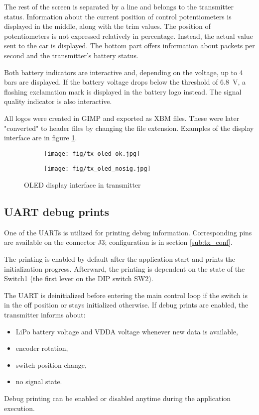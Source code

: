 The rest of the screen is separated by a line and belongs to the transmitter status. Information about the current position of control potentiometers is displayed in the middle, along with the trim values. The position of potentiometers is not expressed relatively in percentage. Instead, the actual value sent to the car is displayed. The bottom part offers information about packets per second and the transmitter's battery status.

Both battery indicators are interactive and, depending on the voltage, up to 4 bars are displayed. If the battery voltage drops below the threshold of \SI{6.8}{\V}, a flashing exclamation mark is displayed in the battery logo instead. The signal quality indicator is also interactive.

All logos were created in GIMP and exported as XBM files. These were later "converted" to header files by changing the file extension. Examples of the display interface are in figure \ref{fig:tx_oled}.
\begin{figure}[t]
    \centering
    \begin{subfigure}{0.4\textwidth}
    \centering
        \texttt{[image: fig/tx\_oled\_ok.jpg]}
    \end{subfigure}%
    \hspace{1cm}
    \begin{subfigure}{0.4\textwidth}
    \centering
		\texttt{[image: fig/tx\_oled\_nosig.jpg]}
    \end{subfigure}
	\caption{OLED display interface in transmitter}
    \label{fig:tx_oled}
\end{figure}

\subsection{UART debug prints}
One of the UARTs is utilized for printing debug information. Corresponding pins are available on the connector J3; configuration is in section \ref{sub:tx_conf}.

The printing is enabled by default after the application start and prints the initialization progress. Afterward, the printing is dependent on the state of the Switch1 (the first lever on the DIP switch SW2).

The UART is deinitialized before entering the main control loop if the switch is in the off position or stays initialized otherwise. If debug prints are enabled, the transmitter informs about:
\begin{itemize}
\item LiPo battery voltage and VDDA voltage whenever new data is available,
\item encoder rotation,
\item switch position change,
\item no signal state.
\end{itemize}
Debug printing can be enabled or disabled anytime during the application execution.



